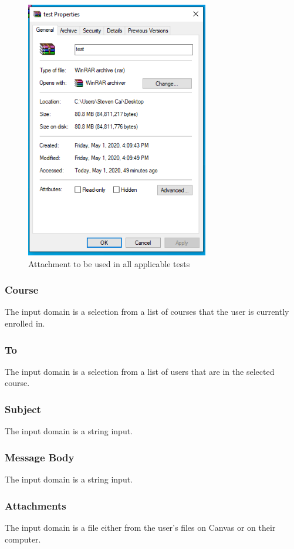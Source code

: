 \documentclass[10pt,letterpaper]{article}
\begin{document}
\begin{figure}[h!]
	\centerline{\includegraphics[width=8cm]{screenshots/compose-message-attachment.png}}
	\caption{Attachment to be used in all applicable tests}
\end{figure}

\subsubsection{Course}
The input domain is a selection from a list of courses that the user is currently enrolled in.

\subsubsection{To}
The input domain is a selection from a list of users that are in the selected course.

\subsubsection{Subject}
The input domain is a string input.

\subsubsection{Message Body}
The input domain is a string input.

\subsubsection{Attachments}
The input domain is a file either from the user’s files on Canvas or on their computer.
\end{document}
